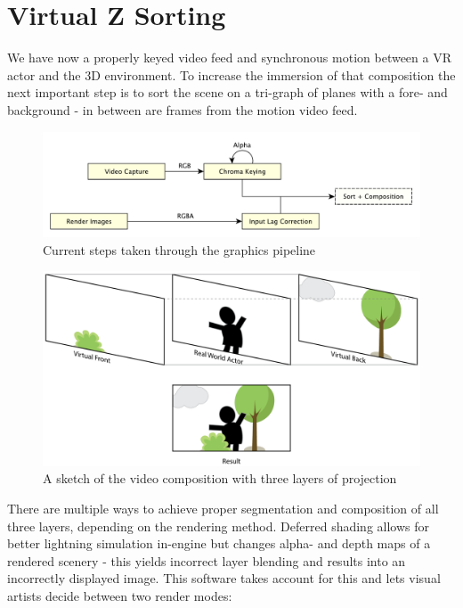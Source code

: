 %
\section{Virtual Z Sorting}

We have now a properly keyed video feed and synchronous motion between a VR 
actor and the 3D environment. To increase the immersion of that composition the 
next important step is to sort the scene on a tri-graph of planes with a fore- 
and background - in between are frames from the motion video feed.

\begin{figure}[htb]
	\includegraphics[width=\textwidth]{_raw_resources/pipeline_steps/4_5_composition.pdf}
	\caption{Current steps taken through the graphics pipeline}
	\label{fig:steps:composition}
\end{figure}

\begin{figure}[htb]
	\includegraphics[width=\textwidth]{gfx/tri-graph.png}
	\caption{A sketch of the video composition with three layers of projection}
	\label{fig:zsort:sketch}
\end{figure}

There are multiple ways to achieve proper segmentation and composition of all 
three layers, depending on the rendering method. Deferred shading allows for 
better lightning simulation in-engine but changes alpha- and depth maps of a 
rendered scenery - this yields incorrect layer blending and results into an 
incorrectly displayed image. This software takes account for this and lets 
visual artists decide between two render modes:

